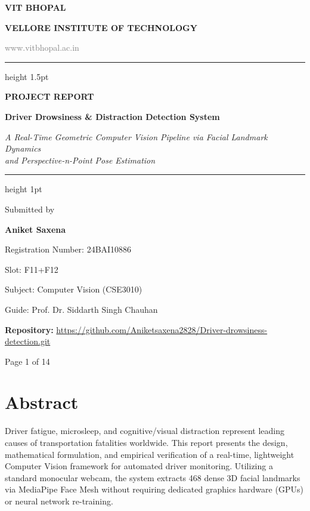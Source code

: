 \documentclass[11pt,a4paper]{article}
\begin{document}
\begin{titlepage}
\centering
\vspace*{1cm}
{\Huge\bfseries\color{vitblue} VIT BHOPAL\par}
\vspace{0.2cm}
{\large\bfseries VELLORE INSTITUTE OF TECHNOLOGY\par}
\vspace{0.1cm}
{\small\textcolor{gray}{www.vitbhopal.ac.in}\par}
\vspace{1.5cm}
\hrule height 1.5pt
\vspace{0.8cm}
{\huge\bfseries\color{vitblue} PROJECT REPORT\par}
\vspace{0.6cm}
{\Large\bfseries Driver Drowsiness \& Distraction Detection System\par}
\vspace{0.4cm}
{\normalsize\itshape A Real-Time Geometric Computer Vision Pipeline via Facial Landmark Dynamics\\and Perspective-n-Point Pose Estimation\par}
\vspace{0.8cm}
\hrule height 1pt
\vspace{2.5cm}

{\large Submitted by\par}
\vspace{0.2cm}
{\Large\bfseries Aniket Saxena\par}
\vspace{0.2cm}
{\normalsize Registration Number: 24BAI10886\par}
{\normalsize Slot: F11+F12\par}
\vspace{0.5cm}
{\normalsize Subject: Computer Vision (CSE3010)\par}
{\normalsize Guide: Prof. Dr. Siddarth Singh Chauhan\par}
\vspace{1.5cm}

\textbf{Repository: } \url{https://github.com/Aniketsaxena2828/Driver-drowsiness-detection.git}

\vfill
{\small Page 1 of 14}
\end{titlepage}

\newpage
\tableofcontents
\newpage

\section*{Abstract}
Driver fatigue, microsleep, and cognitive/visual distraction represent leading causes of transportation fatalities worldwide. This report presents the design, mathematical formulation, and empirical verification of a real-time, lightweight Computer Vision framework for automated driver monitoring. Utilizing a standard monocular webcam, the system extracts 468 dense 3D facial landmarks via MediaPipe Face Mesh without requiring dedicated graphics hardware (GPUs) or neural network re-training. 
\end{document}

